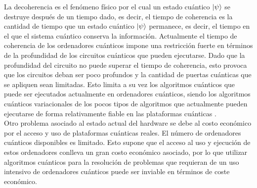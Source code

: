 La decoherencia es el fenómeno físico por el cual un estado cuántico $\ket{\psi}$ se destruye después de un tiempo dado, es decir, el tiempo de coherencia es la cantidad de tiempo que un estado cuántico $\ket{\psi}$ permanece, es decir, el tiempo en el que el sistema cuántico conserva la información. Actualmente el tiempo de coherencia de los ordenadores cuánticos impone una restricción fuerte en términos de la profundidad de los circuitos cuánticos que pueden ejecutarse. Dado que la profundidad del circuito no puede superar el tiempo de coherencia, esto provoca que los circuitos deban ser poco profundos y la cantidad de puertas cuánticas que se apliquen sean limitadas. Esto limita a su vez los algoritmos cuánticos que puede ser ejecutados actualmente en ordenadores cuánticos, siendo los algoritmos cuánticos variacionales de los pocos tipos de algoritmos que actualmente pueden ejecutarse de forma relativamente fiable en las plataformas cuánticas \citep{bharti}. \\

Otro problema asociado al estado actual del hardware se debe al costo económico por el acceso y uso de plataformas cuánticas reales. El número de ordenadores cuánticos disponibles es limitado. Esto supone que el acceso al uso y ejecución de estos ordenadores conlleva un gran costo económico asociado, por lo que utilizar algoritmos cuánticos para la resolución de problemas que requieran de un uso intensivo de ordenadores cuánticos puede ser inviable en términos de coste económico. 





